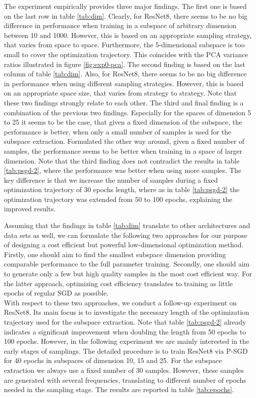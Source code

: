 \documentclass[11pt, a4paper]{article}
\begin{document}
The experiment empirically provides three major findings. The first one is based on the last row in table \ref{tab:dim}. Clearly, for ResNet8, there seems to be no big difference in performance when training in a subspace of arbitrary dimension between 10 and 1000. However, this is based on an appropriate sampling strategy, that varies from space to space. Furthermore, the 5-dimensional subspace is too small to cover the optimization trajectory. This coincides with the PCA variance ratios illustrated in figure \ref{fig:exp0-pca}. The second finding is based on the last column of table \ref{tab:dim}. Also, for ResNet8, there seems to be no big difference in performance when using different sampling strategies. However, this is based on an appropriate space size, that varies from strategy to strategy. Note that these two findings strongly relate to each other. The third and final finding is a combination of the previous two findings. Especially for the spaces of dimension 5 to 25 it seems to be the case, that given a fixed dimension of the subspace, the performance is better, when only a small number of samples is used for the subspace extraction. Formulated the other way around, given a fixed number of samples, the performance seems to be better when training in a space of larger dimension. Note that the third finding does not contradict the results in table \ref{tab:psgd-2}, where the performance was better when using more samples. The key difference is that we increase the number of samples during a fixed optimization trajectory of 30 epochs length, where as in table \ref{tab:psgd-2} the optimization trajectory was extended from 50 to 100 epochs, explaining the improved results.

Assuming that the findings in table \ref{tab:dim} translate to other architectures and data sets as well, we can formulate the following two approaches for our purpose of designing a cost efficient but powerful low-dimensional optimization method. Firstly, one should aim to find the smallest subspace dimension providing comparable performance to the full parameter training. Secondly, one should aim to generate only a few but high quality samples in the most cost efficient way. For the latter approach, optimizing cost efficiency translates to training as little epochs of regular SGD as possible. \\

With respect to these two approaches, we conduct a follow-up experiment on ResNet8. Its main focus is to investigate the necessary length of the optimization trajectory used for the subspace extraction. Note that table \ref{tab:psgd-2} already indicates a significant improvement when doubling the length from 50 epochs to 100 epochs. However, in the following experiment we are mainly interested in the early stages of samplings. The detailed procedure is to train ResNet8 via P-SGD for 40 epochs in subspaces of dimension 10, 15 and 25. For the subspace extraction we always use a fixed number of 30 samples. However, these samples are generated with several frequencies, translating to different number of epochs needed in the sampling stage. The results are reported in table \ref{tab:epochs}.
\end{document}
